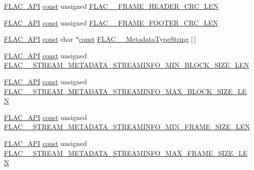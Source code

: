 \begin{DoxyCompactItemize}
\item 
\hyperlink{group__flac__export_ga56ca07df8a23310707732b1c0007d6f5}{F\+L\+A\+C\+\_\+\+A\+PI} \hyperlink{zconf_8h_a2c212835823e3c54a8ab6d95c652660e}{const} unsigned \hyperlink{group__flac__format_ga85cca90abf67913469818af77256d32d}{F\+L\+A\+C\+\_\+\+\_\+\+F\+R\+A\+M\+E\+\_\+\+H\+E\+A\+D\+E\+R\+\_\+\+C\+R\+C\+\_\+\+L\+EN}
\item 
\hyperlink{group__flac__export_ga56ca07df8a23310707732b1c0007d6f5}{F\+L\+A\+C\+\_\+\+A\+PI} \hyperlink{zconf_8h_a2c212835823e3c54a8ab6d95c652660e}{const} unsigned \hyperlink{group__flac__format_gad60e31ade8c94bae295828c8c6f74367}{F\+L\+A\+C\+\_\+\+\_\+\+F\+R\+A\+M\+E\+\_\+\+F\+O\+O\+T\+E\+R\+\_\+\+C\+R\+C\+\_\+\+L\+EN}
\item 
\hyperlink{group__flac__export_ga56ca07df8a23310707732b1c0007d6f5}{F\+L\+A\+C\+\_\+\+A\+PI} \hyperlink{zconf_8h_a2c212835823e3c54a8ab6d95c652660e}{const} char $\ast$\hyperlink{zconf_8h_a2c212835823e3c54a8ab6d95c652660e}{const} \hyperlink{group__flac__format_gaf1ee427883bf9ecc219c25834e89a0ee}{F\+L\+A\+C\+\_\+\+\_\+\+Metadata\+Type\+String} \mbox{[}$\,$\mbox{]}
\item 
\hyperlink{group__flac__export_ga56ca07df8a23310707732b1c0007d6f5}{F\+L\+A\+C\+\_\+\+A\+PI} \hyperlink{zconf_8h_a2c212835823e3c54a8ab6d95c652660e}{const} unsigned \hyperlink{group__flac__format_ga196acfb0e7311915ce5528279b717115}{F\+L\+A\+C\+\_\+\+\_\+\+S\+T\+R\+E\+A\+M\+\_\+\+M\+E\+T\+A\+D\+A\+T\+A\+\_\+\+S\+T\+R\+E\+A\+M\+I\+N\+F\+O\+\_\+\+M\+I\+N\+\_\+\+B\+L\+O\+C\+K\+\_\+\+S\+I\+Z\+E\+\_\+\+L\+EN}
\item 
\hyperlink{group__flac__export_ga56ca07df8a23310707732b1c0007d6f5}{F\+L\+A\+C\+\_\+\+A\+PI} \hyperlink{zconf_8h_a2c212835823e3c54a8ab6d95c652660e}{const} unsigned \hyperlink{group__flac__format_ga6f069aa2f887122aa88f65e5fae2f0e7}{F\+L\+A\+C\+\_\+\+\_\+\+S\+T\+R\+E\+A\+M\+\_\+\+M\+E\+T\+A\+D\+A\+T\+A\+\_\+\+S\+T\+R\+E\+A\+M\+I\+N\+F\+O\+\_\+\+M\+A\+X\+\_\+\+B\+L\+O\+C\+K\+\_\+\+S\+I\+Z\+E\+\_\+\+L\+EN}
\item 
\hyperlink{group__flac__export_ga56ca07df8a23310707732b1c0007d6f5}{F\+L\+A\+C\+\_\+\+A\+PI} \hyperlink{zconf_8h_a2c212835823e3c54a8ab6d95c652660e}{const} unsigned \hyperlink{group__flac__format_ga0bdf42bf21ece52817dbc3d70c3cf73f}{F\+L\+A\+C\+\_\+\+\_\+\+S\+T\+R\+E\+A\+M\+\_\+\+M\+E\+T\+A\+D\+A\+T\+A\+\_\+\+S\+T\+R\+E\+A\+M\+I\+N\+F\+O\+\_\+\+M\+I\+N\+\_\+\+F\+R\+A\+M\+E\+\_\+\+S\+I\+Z\+E\+\_\+\+L\+EN}
\item 
\hyperlink{group__flac__export_ga56ca07df8a23310707732b1c0007d6f5}{F\+L\+A\+C\+\_\+\+A\+PI} \hyperlink{zconf_8h_a2c212835823e3c54a8ab6d95c652660e}{const} unsigned \hyperlink{group__flac__format_gaa206d2c029642f1ad22b101f071d010b}{F\+L\+A\+C\+\_\+\+\_\+\+S\+T\+R\+E\+A\+M\+\_\+\+M\+E\+T\+A\+D\+A\+T\+A\+\_\+\+S\+T\+R\+E\+A\+M\+I\+N\+F\+O\+\_\+\+M\+A\+X\+\_\+\+F\+R\+A\+M\+E\+\_\+\+S\+I\+Z\+E\+\_\+\+L\+EN}

\end{DoxyCompactItemize}
